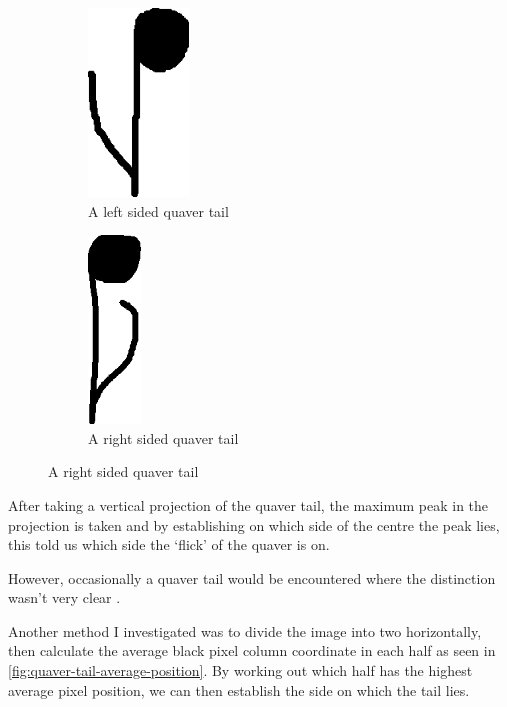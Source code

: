 \begin{figure}[h!]
    \centering

    \begin{subfigure}[b]{.45\linewidth}
        \centering
      \includegraphics[height=5cm]{gfx/techniques/quaver-left-6087.png}
      \caption{A left sided quaver tail}
      \label{fig:quaver-tail-left}
    \end{subfigure}
    \begin{subfigure}[b]{.45\linewidth}
        \centering
      \includegraphics[height=5cm]{gfx/techniques/quaver-right-3083.png}
      \caption{A right sided quaver tail}
      \label{fig:quaver-tail-right}
    \end{subfigure}
    
\end{figure}

After taking a vertical projection of the quaver tail, the maximum peak in the projection is taken and by establishing on which side of the centre the peak lies, this told us which side the `flick' of the quaver is on.

However, occasionally a quaver tail would be encountered where the distinction wasn't very clear .

Another method I investigated was to divide the image into two horizontally, then calculate the average black pixel column coordinate in each half as seen in \cref{fig:quaver-tail-average-position}. By working out which half has the highest average pixel position, we can then establish the side on which the tail lies.

